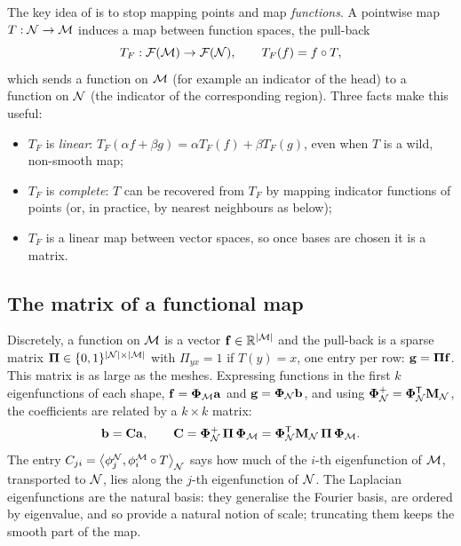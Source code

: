 The key idea of \citet{Ovsjanikov2012} is to stop mapping points and map \emph{functions}. A
pointwise map $T:\mathcal{N}\to\mathcal{M}$ induces a map between function spaces, the pull-back
\begin{equation}
T_F:\mathcal F(\mathcal{M})\to\mathcal F(\mathcal{N}),\qquad T_F(f)=f\circ T ,
\end{equation}
which sends a function on $\mathcal{M}$ (for example an indicator of the head) to a function on $\mathcal{N}$ (the
indicator of the corresponding region). Three facts make this useful:
\begin{itemize}
  \item $T_F$ is \emph{linear}: $T_F(\alpha f+\beta g)=\alpha T_F(f)+\beta T_F(g)$, even when $T$ is a
  wild, non-smooth map;
  \item $T_F$ is \emph{complete}: $T$ can be recovered from $T_F$ by mapping indicator functions of
  points (or, in practice, by nearest neighbours as below);
  \item $T_F$ is a linear map between vector spaces, so once bases are chosen it is a matrix.
\end{itemize}

\subsection{The matrix of a functional map}

Discretely, a function on $\mathcal{M}$ is a vector $\mathbf{f}\in\mathbb{R}^{\left\lvert \mathcal{M}\right\rvert}$ and the pull-back is a sparse matrix
$\boldsymbol{\Pi}\in\{0,1\}^{\left\lvert \mathcal{N}\right\rvert\times\left\lvert \mathcal{M}\right\rvert}$ with $\Pi_{yx}=1$ if $T(y)=x$, one entry per row:
$\mathbf{g}=\boldsymbol{\Pi}\mathbf{f}$. This matrix is as large as the meshes. Expressing functions in the first $k$
eigenfunctions of each shape, $\mathbf{f}=\boldsymbol{\Phi}_{\mathcal{M}}\mathbf a$ and $\mathbf{g}=\boldsymbol{\Phi}_{\mathcal{N}}\mathbf b$, and using
$\boldsymbol{\Phi}_{\mathcal{N}}^+=\boldsymbol{\Phi}_{\mathcal{N}}^{\mathsf{T}}\mathbf{M}_{\mathcal{N}}$, the coefficients are related by a $k\times k$ matrix:
\begin{equation}
\mathbf b=\mathbf{C}\mathbf a,\qquad \mathbf{C}=\boldsymbol{\Phi}_{\mathcal{N}}^+\,\boldsymbol{\Pi}\,\boldsymbol{\Phi}_{\mathcal{M}}=\boldsymbol{\Phi}_{\mathcal{N}}^{\mathsf{T}}\mathbf{M}_{\mathcal{N}}\,\boldsymbol{\Pi}\,\boldsymbol{\Phi}_{\mathcal{M}} .
\label{eq:fmap}
\end{equation}
The entry $C_{ji}=\left\langle \phi^{\mathcal{N}}_j,\phi^{\mathcal{M}}_i\circ T\right\rangle_{\mathcal{N}}$ says how much of the $i$-th
eigenfunction of $\mathcal{M}$, transported to $\mathcal{N}$, lies along the $j$-th eigenfunction of $\mathcal{N}$. The Laplacian
eigenfunctions are the natural basis: they generalise the Fourier basis, are ordered by eigenvalue,
and so provide a natural notion of scale; truncating them keeps the smooth part of the map.

